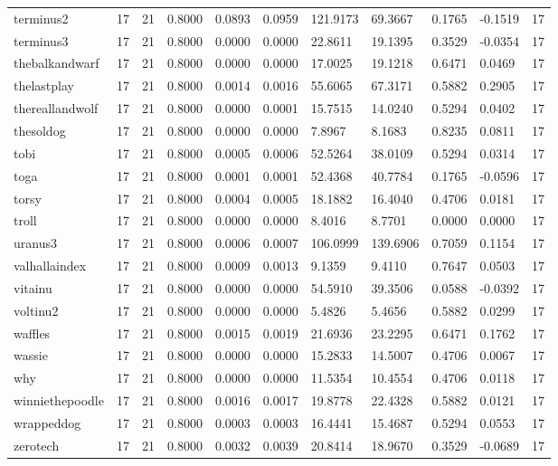 \begin{table}[htbp]
\begin{tabular}{lllllllllll}
terminus2 & 17 & 21 & 0.8000 & 0.0893 & 0.0959 & 121.9173 & 69.3667 & 0.1765 & -0.1519 & 17 \\
terminus3 & 17 & 21 & 0.8000 & 0.0000 & 0.0000 & 22.8611 & 19.1395 & 0.3529 & -0.0354 & 17 \\
thebalkandwarf & 17 & 21 & 0.8000 & 0.0000 & 0.0000 & 17.0025 & 19.1218 & 0.6471 & 0.0469 & 17 \\
thelastplay & 17 & 21 & 0.8000 & 0.0014 & 0.0016 & 55.6065 & 67.3171 & 0.5882 & 0.2905 & 17 \\
thereallandwolf & 17 & 21 & 0.8000 & 0.0000 & 0.0001 & 15.7515 & 14.0240 & 0.5294 & 0.0402 & 17 \\
thesoldog & 17 & 21 & 0.8000 & 0.0000 & 0.0000 & 7.8967 & 8.1683 & 0.8235 & 0.0811 & 17 \\
tobi & 17 & 21 & 0.8000 & 0.0005 & 0.0006 & 52.5264 & 38.0109 & 0.5294 & 0.0314 & 17 \\
toga & 17 & 21 & 0.8000 & 0.0001 & 0.0001 & 52.4368 & 40.7784 & 0.1765 & -0.0596 & 17 \\
torsy & 17 & 21 & 0.8000 & 0.0004 & 0.0005 & 18.1882 & 16.4040 & 0.4706 & 0.0181 & 17 \\
troll & 17 & 21 & 0.8000 & 0.0000 & 0.0000 & 8.4016 & 8.7701 & 0.0000 & 0.0000 & 17 \\
uranus3 & 17 & 21 & 0.8000 & 0.0006 & 0.0007 & 106.0999 & 139.6906 & 0.7059 & 0.1154 & 17 \\
valhallaindex & 17 & 21 & 0.8000 & 0.0009 & 0.0013 & 9.1359 & 9.4110 & 0.7647 & 0.0503 & 17 \\
vitainu & 17 & 21 & 0.8000 & 0.0000 & 0.0000 & 54.5910 & 39.3506 & 0.0588 & -0.0392 & 17 \\
voltinu2 & 17 & 21 & 0.8000 & 0.0000 & 0.0000 & 5.4826 & 5.4656 & 0.5882 & 0.0299 & 17 \\
waffles & 17 & 21 & 0.8000 & 0.0015 & 0.0019 & 21.6936 & 23.2295 & 0.6471 & 0.1762 & 17 \\
wassie & 17 & 21 & 0.8000 & 0.0000 & 0.0000 & 15.2833 & 14.5007 & 0.4706 & 0.0067 & 17 \\
why & 17 & 21 & 0.8000 & 0.0000 & 0.0000 & 11.5354 & 10.4554 & 0.4706 & 0.0118 & 17 \\
winniethepoodle & 17 & 21 & 0.8000 & 0.0016 & 0.0017 & 19.8778 & 22.4328 & 0.5882 & 0.0121 & 17 \\
wrappeddog & 17 & 21 & 0.8000 & 0.0003 & 0.0003 & 16.4441 & 15.4687 & 0.5294 & 0.0553 & 17 \\
zerotech & 17 & 21 & 0.8000 & 0.0032 & 0.0039 & 20.8414 & 18.9670 & 0.3529 & -0.0689 & 17 \\

\end{tabular}
\end{table}
